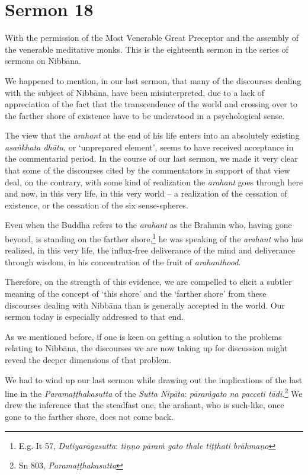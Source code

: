 \chapter{Sermon 18}

\NibbanaOpeningQuote

With the permission of the Most Venerable Great Preceptor and the assembly of the venerable meditative monks. This is the eighteenth sermon in the series of sermons on Nibbāna.

We happened to mention, in our last sermon, that many of the discourses dealing with the subject of Nibbāna, have been misinterpreted, due to a lack of appreciation of the fact that the transcendence of the world and crossing over to the farther shore of existence have to be understood in a psychological sense.

The view that the \emph{arahant} at the end of his life enters into an absolutely existing \emph{asaṅkhata dhātu}, or `unprepared element', seems to have received acceptance in the commentarial period. In the course of our last sermon, we made it very clear that some of the discourses cited by the commentators in support of that view deal, on the contrary, with some kind of realization the \emph{arahant} goes through here and now, in this very life, in this very world -- a realization of the cessation of existence, or the cessation of the six sense-spheres.

Even when the Buddha refers to the \emph{arahant} as the Brahmin who, having gone beyond, is standing on the farther shore,\footnote{E.g. It 57, \emph{Dutiyarāgasutta}: \emph{tiṇṇo pāraṁ gato thale tiṭṭhati brāhmaṇo}} he was speaking of the \emph{arahant} who has realized, in this very life, the influx-free deliverance of the mind and deliverance through wisdom, in his concentration of the fruit of \emph{arahanthood}.

Therefore, on the strength of this evidence, we are compelled to elicit a subtler meaning of the concept of `this shore' and the `farther shore' from these discourses dealing with Nibbāna than is generally accepted in the world. Our sermon today is especially addressed to that end.

As we mentioned before, if one is keen on getting a solution to the problems relating to Nibbāna, the discourses we are now taking up for discussion might reveal the deeper dimensions of that problem.

We had to wind up our last sermon while drawing out the implications of the last line in the \emph{Paramaṭṭhakasutta} of the \emph{Sutta Nipāta}: \emph{pāraṁgato na pacceti tādi.}\footnote{Sn 803, \emph{Paramaṭṭhakasutta}} We drew the inference that the steadfast one, the arahant, who is such-like, once gone to the farther shore, does not come back.

